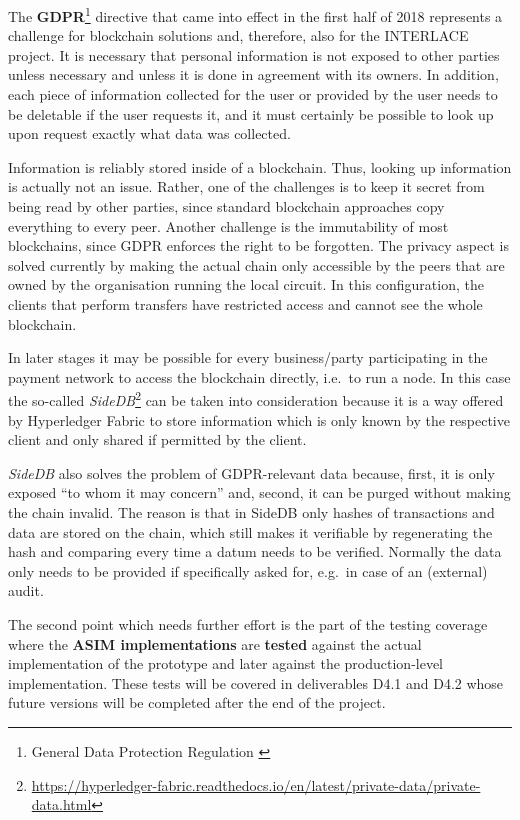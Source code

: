 The \textbf{GDPR}\footnote{General Data Protection Regulation \cite{GDPR}} directive that came into effect in the first half of 2018 represents a challenge for blockchain solutions and, therefore, also for the INTERLACE project. It is necessary that personal information is not exposed to other parties unless necessary and unless it is done in agreement with its owners. In addition, each piece of information collected for the user or provided by the user needs to be deletable if the user requests it, and it must certainly be possible to look up upon request exactly what data was collected.

Information is reliably stored inside of a blockchain. Thus, looking up information is actually not an issue. Rather, one of the challenges is to keep it secret from being read by other parties, since standard blockchain approaches copy everything to every peer. Another challenge is the immutability of most blockchains, since GDPR enforces the right to be forgotten. The privacy aspect is solved currently by making the actual chain only accessible by the peers that are owned by the organisation running the local circuit. In this configuration, the clients that perform transfers have restricted access and cannot see the whole blockchain.

In later stages it may be possible for every business/party participating in the payment network to access the blockchain directly, i.e.\ to run a node. In this case the so-called \textit{SideDB}\footnote{\url{https://hyperledger-fabric.readthedocs.io/en/latest/private-data/private-data.html}} can be taken into consideration because it is a way offered by Hyperledger Fabric to store information which is only known by the respective client and only shared if permitted by the client.

\textit{SideDB} also solves the problem of GDPR-relevant data because, first, it is only exposed ``to whom it may concern'' and, second, it can be purged without making the chain invalid. The reason is that in SideDB only hashes of transactions and data are stored on the chain, which still makes it verifiable by regenerating the hash and comparing every time a datum needs to be verified. Normally the data only needs to be provided if specifically asked for, e.g.\ in case of an (external) audit.

The second point which needs further effort is the part of the testing coverage where the \textbf{ASIM implementations} are \textbf{tested} against the actual implementation of the prototype and later against the production-level implementation. These tests will be covered in deliverables D4.1 and D4.2 whose future versions will be completed after the end of the project.






